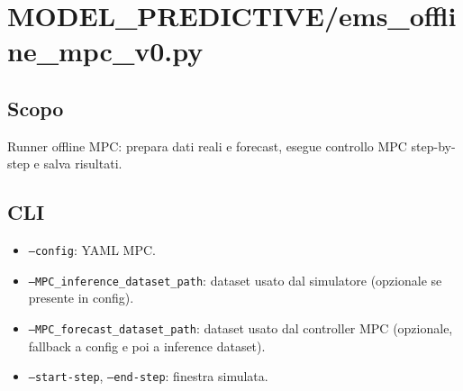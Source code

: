 \section{MODEL\_PREDICTIVE/ems\_offline\_mpc\_v0.py}

\subsection*{Scopo}
Runner offline MPC: prepara dati reali e forecast, esegue controllo MPC step-by-step e salva risultati.

\subsection*{CLI}
\begin{itemize}[leftmargin=1.2cm]
\item \texttt{--config}: YAML MPC.
\item \texttt{--MPC\_inference\_dataset\_path}: dataset usato dal simulatore (opzionale se presente in config).
\item \texttt{--MPC\_forecast\_dataset\_path}: dataset usato dal controller MPC (opzionale, fallback a config e poi a inference dataset).
\item \texttt{--start-step}, \texttt{--end-step}: finestra simulata.
\end{itemize}

